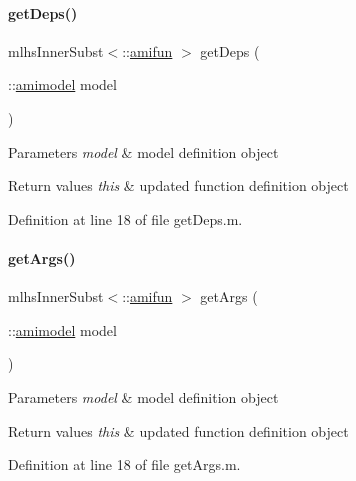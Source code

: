 \paragraph{\texorpdfstring{get\+Deps()}{getDeps()}}
{\footnotesize\ttfamily mlhs\+Inner\+Subst$<$\+::\mbox{\hyperlink{classamifun}{amifun}} $>$ get\+Deps (\begin{DoxyParamCaption}\item[{\+::\mbox{\hyperlink{classamimodel}{amimodel}}}]{model }\end{DoxyParamCaption})}


\begin{DoxyParams}{Parameters}
{\em model} & model definition object\\
\hline
\end{DoxyParams}

\begin{DoxyRetVals}{Return values}
{\em this} & updated function definition object \\
\hline
\end{DoxyRetVals}


Definition at line 18 of file get\+Deps.\+m.

\mbox{\label{classamifun_a4b16e7670c0d60e530545e58628bde3f}} 
\paragraph{\texorpdfstring{get\+Args()}{getArgs()}}
{\footnotesize\ttfamily mlhs\+Inner\+Subst$<$\+::\mbox{\hyperlink{classamifun}{amifun}} $>$ get\+Args (\begin{DoxyParamCaption}\item[{\+::\mbox{\hyperlink{classamimodel}{amimodel}}}]{model }\end{DoxyParamCaption})}


\begin{DoxyParams}{Parameters}
{\em model} & model definition object\\
\hline
\end{DoxyParams}

\begin{DoxyRetVals}{Return values}
{\em this} & updated function definition object \\
\hline
\end{DoxyRetVals}


Definition at line 18 of file get\+Args.\+m.

